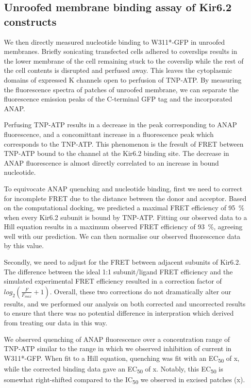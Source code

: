 \subsection{Unroofed membrane binding assay of Kir6.2 constructs}

We then directly measured nucleotide binding to W311*-GFP in unroofed membranes.
Briefly sonicating transfected cells adhered to coverslips results in the lower membrane of the cell remaining stuck to the coverslip while the rest of the cell contents is disrupted and perfused away.
This leaves the cytoplasmic domains of expressed K\ATP{} channels open to perfusion of TNP-ATP.
By measuring the fluorescence spectra of patches of unroofed membrane, we can separate the fluorescence emission peaks of the C-terminal GFP tag and the incorporated ANAP.

Perfusing TNP-ATP results in a decrease in the peak corresponding to ANAP fluorescence, and a concomittant increase in a fluorescence peak which corresponds to the TNP-ATP.
This phenomenon is the fresult of FRET between TNP-ATP bound to the channel at the Kir6.2 binding site.
The decrease in ANAP fluorescence is almost directly correlated to an increase in bound nucleotide.

To equivocate ANAP quenching and nucleotide binding, first we need to correct for incomplete FRET due to the distance between the donor and acceptor.
Based on the computational docking, we predicted a maximal FRET efficiency of \SI{95}{\percent} when every Kir6.2 subunit is bound by TNP-ATP.
Fitting our observed data to a Hill equation results in a maximum observed FRET efficiency of \SI{93}{\percent}, agreeing well with our prediction.
We can then normalise our observed fluorescence data by this value.

Secondly, we need to adjust for the FRET between adjacent subunits of Kir6.2.
The difference between the ideal 1:1 subunit/ligand FRET efficiency and the simulated experimental FRET efficiency resulted in a correction factor of $log_2(\frac{F}{F_{max}} + 1)$.
Overall, these two corrections do not dramatically alter our results, and we performed our analysis on both corrected and uncorrected results to ensure that there was no potential difference in interpration which derived from treating our data in this way.

We observed quenching of ANAP fluorescence over a concentration range of TNP-ATP similar to the range in which we observed inhibition of current in W311*-GFP.
When fit to a Hill equation, quenching was fit with an EC\textsubscript{50} of x, while the corrected binding data gave an EC\textsubscript{50} of x.
Notably, this EC\textsubscript{50} is somewhat right-shifted compared to the IC\textsubscript{50} we observed in excised patches (x).

